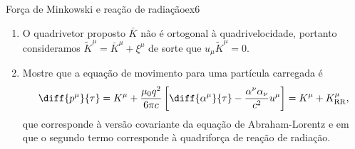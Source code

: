 \begin{exercício}{Força de Minkowski e reação de radiação}{ex6}
\begin{enumerate}[label=(\alph*)]
      \begin{equation*}
         \bar{K}^\mu = K^\mu - \frac{\mu_0 q^2}{6\pi c^3} \alpha^\nu \alpha_\nu u^\mu
      \end{equation*}
      satisfaz a condição desejada para a componente temporal mesmo para velocidades não nulas.
      \item O quadrivetor proposto \(\bar{K}\) não é ortogonal à quadrivelocidade, portanto consideramos \(\tilde{K}^\mu = \bar{K}^\mu + \xi^\mu\) de sorte que \(u_\mu \tilde{K}^\mu = 0\).
      \item Mostre que a equação de movimento para uma partícula carregada é
      \begin{equation*}
         \diff{p^\mu}{\tau} = K^\mu + \frac{\mu_0q^2}{6\pi c}\left[\diff{\alpha^\mu}{\tau} - \frac{\alpha^\nu \alpha_\nu}{c^2}u^\mu\right] = K^\mu + K^\mu_{\mathrm{RR}},
      \end{equation*}
      que corresponde à versão covariante da equação de Abraham-Lorentz e em que o segundo termo corresponde à quadriforça de reação de radiação.
   \end{enumerate}
\end{exercício}
